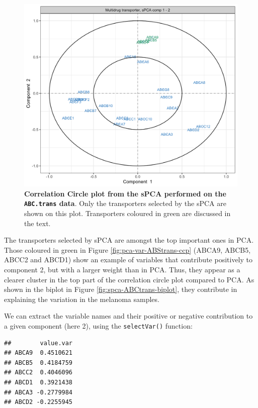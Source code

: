 \documentclass[]{book}
\newenvironment{Shaded}{\begin{snugshade}}{\end{snugshade}}
\newcommand{\CommentTok}[1]{\textcolor[rgb]{0.56,0.35,0.01}{\textit{#1}}}
\newcommand{\DataTypeTok}[1]{\textcolor[rgb]{0.13,0.29,0.53}{#1}}
\newcommand{\DecValTok}[1]{\textcolor[rgb]{0.00,0.00,0.81}{#1}}
\newcommand{\KeywordTok}[1]{\textcolor[rgb]{0.13,0.29,0.53}{\textbf{#1}}}
\newcommand{\NormalTok}[1]{#1}
\newcommand{\OperatorTok}[1]{\textcolor[rgb]{0.81,0.36,0.00}{\textbf{#1}}}
\begin{document}
\begin{figure}

{\centering \includegraphics[width=0.5\linewidth]{Figures/PCA/spca-var-ABStrans-ccp-1} 

}

\caption{\textbf{Correlation Circle plot from the sPCA performed on the \texttt{ABC.trans} data}. Only the transporters selected by the sPCA are shown on this plot. Transporters coloured in green are discussed in the text.}\label{fig:spca-var-ABStrans-ccp}
\end{figure}



The transporters selected by sPCA are amongst the top important ones in PCA. Those coloured in green in Figure \ref{fig:pca-var-ABStrans-ccp} (ABCA9, ABCB5, ABCC2 and ABCD1) show an example of variables that contribute positively to component 2, but with a larger weight than in PCA. Thus, they appear as a clearer cluster in the top part of the correlation circle plot compared to PCA. As shown in the biplot in Figure \ref{fig:spca-ABCtrans-biplot}, they contribute in explaining the variation in the melanoma samples.

We can extract the variable names and their positive or negative contribution to a given component (here 2), using the \texttt{selectVar()} function:

\begin{Shaded}
\end{Shaded}

\begin{verbatim}
##        value.var
## ABCA9  0.4510621
## ABCB5  0.4184759
## ABCC2  0.4046096
## ABCD1  0.3921438
## ABCA3 -0.2779984
## ABCD2 -0.2255945
\end{verbatim}
\end{document}
